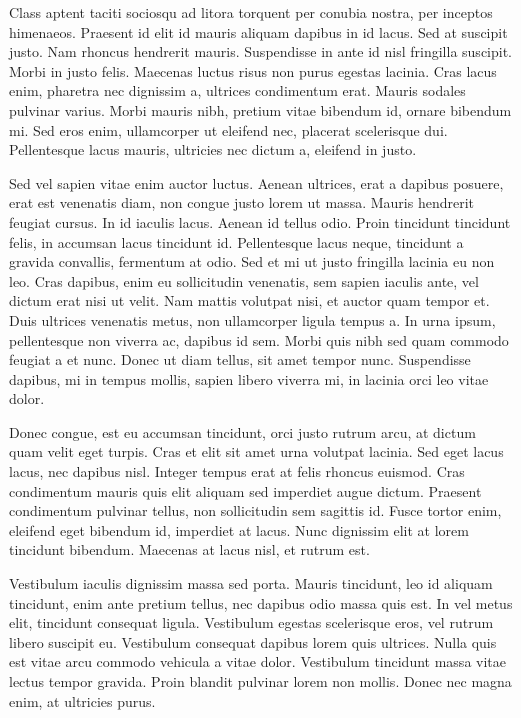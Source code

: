 \documentclass[12pt,lot,lof]{quthesis}
\begin{document}
Class aptent taciti sociosqu ad litora torquent per conubia nostra, per inceptos himenaeos. Praesent id elit id mauris aliquam dapibus in id lacus. Sed at suscipit justo. Nam rhoncus hendrerit mauris. Suspendisse in ante id nisl fringilla suscipit. Morbi in justo felis. Maecenas luctus risus non purus egestas lacinia. Cras lacus enim, pharetra nec dignissim a, ultrices condimentum erat. Mauris sodales pulvinar varius. Morbi mauris nibh, pretium vitae bibendum id, ornare bibendum mi. Sed eros enim, ullamcorper ut eleifend nec, placerat scelerisque dui. Pellentesque lacus mauris, ultricies nec dictum a, eleifend in justo.

Sed vel sapien vitae enim auctor luctus. Aenean ultrices, erat a dapibus posuere, erat est venenatis diam, non congue justo lorem ut massa. Mauris hendrerit feugiat cursus. In id iaculis lacus. Aenean id tellus odio. Proin tincidunt tincidunt felis, in accumsan lacus tincidunt id. Pellentesque lacus neque, tincidunt a gravida convallis, fermentum at odio. Sed et mi ut justo fringilla lacinia eu non leo. Cras dapibus, enim eu sollicitudin venenatis, sem sapien iaculis ante, vel dictum erat nisi ut velit. Nam mattis volutpat nisi, et auctor quam tempor et. Duis ultrices venenatis metus, non ullamcorper ligula tempus a. In urna ipsum, pellentesque non viverra ac, dapibus id sem. Morbi quis nibh sed quam commodo feugiat a et nunc. Donec ut diam tellus, sit amet tempor nunc. Suspendisse dapibus, mi in tempus mollis, sapien libero viverra mi, in lacinia orci leo vitae dolor.

Donec congue, est eu accumsan tincidunt, orci justo rutrum arcu, at dictum quam velit eget turpis. Cras et elit sit amet urna volutpat lacinia. Sed eget lacus lacus, nec dapibus nisl. Integer tempus erat at felis rhoncus euismod. Cras condimentum mauris quis elit aliquam sed imperdiet augue dictum. Praesent condimentum pulvinar tellus, non sollicitudin sem sagittis id. Fusce tortor enim, eleifend eget bibendum id, imperdiet at lacus. Nunc dignissim elit at lorem tincidunt bibendum. Maecenas at lacus nisl, et rutrum est.

Vestibulum iaculis dignissim massa sed porta. Mauris tincidunt, leo id aliquam tincidunt, enim ante pretium tellus, nec dapibus odio massa quis est. In vel metus elit, tincidunt consequat ligula. Vestibulum egestas scelerisque eros, vel rutrum libero suscipit eu. Vestibulum consequat dapibus lorem quis ultrices. Nulla quis est vitae arcu commodo vehicula a vitae dolor. Vestibulum tincidunt massa vitae lectus tempor gravida. Proin blandit pulvinar lorem non mollis. Donec nec magna enim, at ultricies purus.
\end{document}

